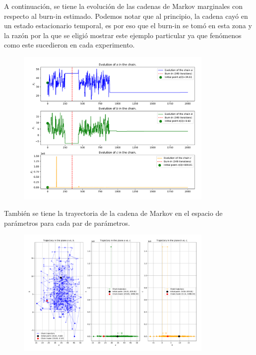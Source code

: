 A continuación, se tiene la evolución de las cadenas de Markov marginales con respecto al burn-in estimado. Podemos notar que al principio, la cadena cayó en un estado estacionario temporal, es por eso que el burn-in se tomó en esta zona y la razón por la que se eligió mostrar este ejemplo particular ya que fenómenos como este sucedieron en cada experimento.

\begin{figure}[h!]
	\centering
	\includegraphics[width=0.845\textwidth]{IMAGENES/marginal_evolution_ex2.pdf}
\end{figure}

También se tiene la trayectoria de la cadena de Markov en el espacio de parámetros para cada par de parámetros.

\begin{figure}[h!]
	\centering
	\includegraphics[width=0.845\textwidth]{IMAGENES/trayectory_ex2.pdf}
\end{figure}

